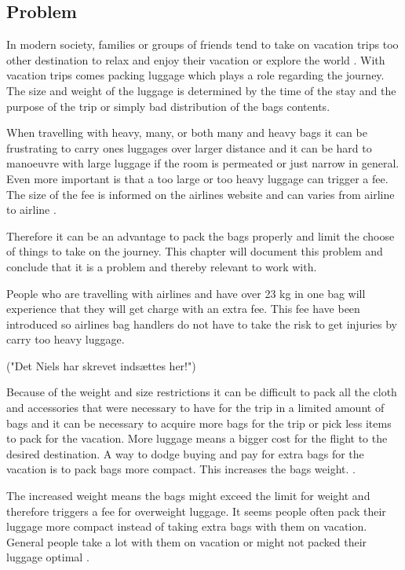 \subsection{Problem}
In modern society, families or groups of friends tend to take on vacation trips too other destination to relax and enjoy their vacation or explore the world \citep{danskecharter}.
With vacation trips comes packing luggage which plays a role regarding the journey. The size and weight of the luggage is determined by the time of the stay and the purpose of the trip or simply bad distribution of the bags contents.

When travelling with heavy, many, or both many and heavy bags it can be frustrating to carry ones luggages over larger distance and it can be hard to manoeuvre with large luggage if the room is permeated or just narrow in general. Even more important is that a too large or too heavy luggage can trigger a fee. The size of the fee is informed on the airlines website and can varies from airline to airline \citep{altombag}.

Therefore it can be an advantage to pack the bags properly and limit the choose of things to take on the journey.
This chapter will document this problem and conclude that it is a problem and thereby relevant to work with.

People who are travelling with airlines and have over 23 kg in one bag will experience that they will get charge with an extra fee. This fee have been introduced so airlines bag handlers do not have to take the risk to get injuries by carry too heavy luggage.

("Det Niels har skrevet indsættes her!")

Because of the weight and size restrictions it can be difficult to pack all the cloth and accessories that were necessary to have for the trip in a limited amount of bags and it can be necessary to acquire more bags for the trip or pick less items to pack for the vacation. More luggage means a bigger cost for the flight to the desired destination. A way to dodge buying and pay for extra bags for the vacation is to pack bags more compact. This increases the bags weight. \citep{altombag}.

The increased weight means the bags might exceed the limit for weight and therefore triggers a fee for overweight luggage.
It seems people often pack their luggage more compact instead of taking extra bags with them on vacation. General people take a lot with them on vacation or might not packed their luggage optimal \citep{airstat}.

